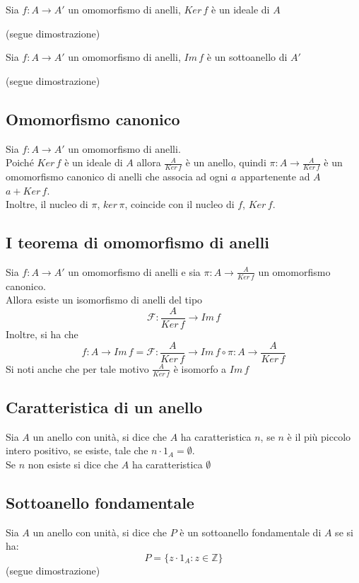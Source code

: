 \begin{flushleft}
\begin{proprieta}
Sia $f:A\to A'$ un omomorfismo di anelli, $Ker\,f$ è un ideale di $A$
\end{proprieta}
(segue dimostrazione)
\\ \vspace{300px}

\begin{proprieta}
Sia $f:A\to A'$ un omomorfismo di anelli, $Im\,f$ è un sottoanello di $A'$
\end{proprieta}
(segue dimostrazione)
\\ \vspace{300px}


\subsection{Omomorfismo canonico}
Sia $f:A\to A'$ un omomorfismo di anelli.\\
Poiché $Ker\,f$ è un ideale di $A$ allora $\frac{A}{Ker\,f}$ è un anello, quindi $\pi:A\to \frac{A}{Ker\,f}$ è un omomorfismo canonico di anelli che associa ad ogni $a$ appartenente ad $A$ $a + Ker\,f$.\\
Inoltre, il nucleo di $\pi$, $ker\,\pi$, coincide con il nucleo di $f$, $Ker\,f$.

\subsection{I teorema di omomorfismo di anelli}
Sia $f:A\to A'$ un omomorfismo di anelli e sia $\pi:A\to\frac{A}{Ker\,f}$ un omomorfismo canonico.\\
Allora esiste un isomorfismo di anelli del tipo
\[\mathcal{F}: \frac{A}{Ker\,f} \to Im\,f\]
Inoltre, si ha che
\[f:A\to Im\,f = \mathcal{F}: \frac{A}{Ker\,f} \to Im\,f \circ \pi:A\to\frac{A}{Ker\,f}\]
Si noti anche che per tale motivo $\frac{A}{Ker\,f}$ è isomorfo a $Im\,f$

\subsection{Caratteristica di un anello}
Sia $A$ un anello con unità, si dice che $A$ ha caratteristica $n$, se $n$ è il più piccolo intero positivo, se esiste, tale che $n\cdot 1_A = \emptyset$.\\
Se $n$ non esiste si dice che $A$ ha caratteristica $\emptyset$

\subsection{Sottoanello fondamentale}
Sia $A$ un anello con unità, si dice che $P$ è un sottoanello fondamentale di $A$ se si ha:
\[P = \{z\cdot 1_A: z\in \mathbb{Z}\}\]
(segue dimostrazione)
\\ \vspace{300px}


\end{flushleft}
